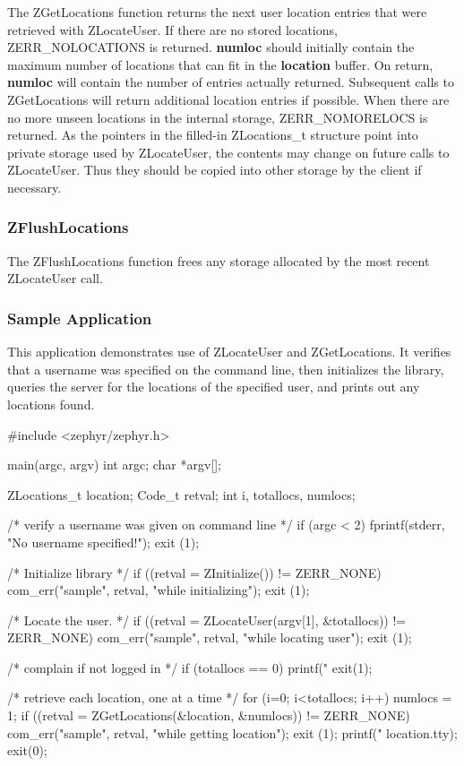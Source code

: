 The ZGetLocations function returns the next user location entries that
were retrieved with ZLocateUser.  If there are no stored locations,
ZERR_NOLOCATIONS is returned.  {\bf *numloc} should initially contain
the maximum number of locations that can fit in the {\bf location}
buffer.  On return, {\bf *numloc} will contain the number of entries
actually returned.  Subsequent calls to ZGetLocations will return
additional location entries if possible.  When there are no more unseen
locations in the internal storage, ZERR_NOMORELOCS is returned.  As the
pointers in the filled-in ZLocations_t structure point into private
storage used by ZLocateUser, the contents may change on future calls to
ZLocateUser.  Thus they should be copied into other storage by the
client if necessary.

\subsubsection{ZFlushLocations}
\label{ZFlushLocations}

\etemplate
{}

The ZFlushLocations function frees any storage allocated by the
most recent ZLocateUser call.

\subsubsection{Sample Application}

This application demonstrates use of ZLocateUser and ZGetLocations.  It
verifies that a username was specified on the command line, then
initializes the library, queries the server for the locations of the
specified user, and prints out any locations found.

\begin{code}
#include <zephyr/zephyr.h>

main(argc, argv)
    int argc;
    char *argv[];
{
    ZLocations_t location;
    Code_t retval;
    int i, totallocs, numlocs;

    /* verify a username was given on command line */
    if (argc < 2) {
        fprintf(stderr, "No username specified!\n");
        exit (1);
    }

    /* Initialize library */
    if ((retval = ZInitialize()) != ZERR_NONE) {
        com_err("sample", retval, "while initializing");
        exit (1);
    }

    /* Locate the user. */
    if ((retval = ZLocateUser(argv[1], &totallocs)) != ZERR_NONE) {
        com_err("sample", retval, "while locating user");
        exit (1);
    }

    /* complain if not logged in */
    if (totallocs == 0) {
        printf("%
        exit(1);
    }

    /* retrieve each location, one at a time */
    for (i=0; i<totallocs; i++) {
        numlocs = 1;
        if ((retval = ZGetLocations(&location, &numlocs)) != ZERR_NONE) {
            com_err("sample", retval, "while getting location");
            exit (1);
        }
        printf("%
            location.tty);
    }
    exit(0);
}
\end{code}
